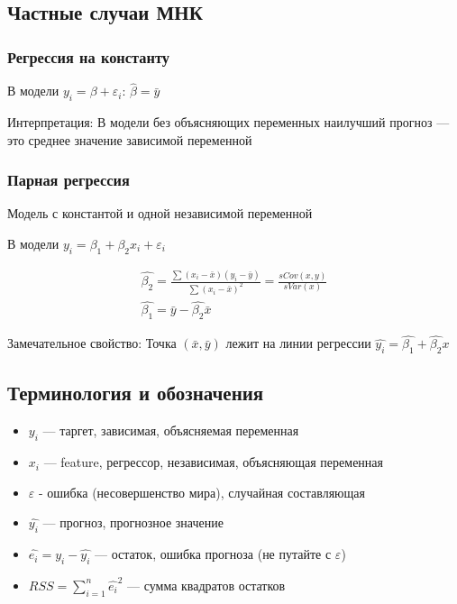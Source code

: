 \documentclass[12pt,a4paper]{article}
\numberwithin{equation}{section}
\theoremstyle{plain}
\theoremstyle{definition}
\theoremstyle{remark}
\begin{document}
\subsection{Частные случаи МНК}

\subsubsection{Регрессия на константу}

В модели $y_i = \beta + \varepsilon_i$: $\hat{\beta} = \bar{y}$

Интерпретация: В модели без объясняющих переменных наилучший прогноз — это среднее значение зависимой переменной

\subsubsection{Парная регрессия}

Модель с константой и одной независимой переменной

В модели $y_i = \beta_1 + \beta_2 x_i + \varepsilon_i$

\begin{gather*}
    \hat{\beta_2} = \frac{\sum \left(x_i - \bar{x}\right)\left(y_i - \bar{y}\right)}{\sum \left(x_i - \bar{x}\right)^2} = \frac{s Cov (x, y)}{s Var(x)} \\
    \hat{\beta_1} = \bar{y} - \hat{\beta_2}\bar{x}
\end{gather*}

Замечательное свойство: Точка $\left(\bar{x}, \bar{y}\right)$ лежит на линии регрессии $\hat{y_i} = \hat{\beta_1} + \hat{\beta_2} x$

\subsection{Терминология и обозначения}

\begin{itemize}
    \item $y_i$ — таргет, зависимая, объясняемая переменная
    \item $x_i$ — feature, регрессор, независимая, объясняющая переменная
    \item $\varepsilon$ - ошибка (несовершенство мира), случайная составляющая
    \item $\hat{y_i}$ — прогноз, прогнозное значение
    \item $\hat{e_i} = y_i - \hat{y_i}$ — остаток, ошибка прогноза (не путайте с $\varepsilon$)
    \item $RSS = \sum_{i = 1}^{n} \hat{e_i}^2$ — сумма квадратов остатков
\end{itemize}
\end{document}

